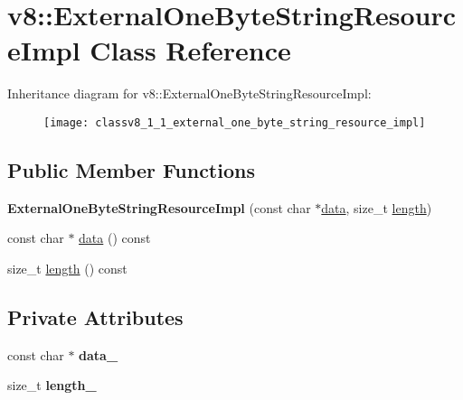 \hypertarget{classv8_1_1_external_one_byte_string_resource_impl}{}\section{v8\+:\+:External\+One\+Byte\+String\+Resource\+Impl Class Reference}
\label{classv8_1_1_external_one_byte_string_resource_impl}
Inheritance diagram for v8\+:\+:External\+One\+Byte\+String\+Resource\+Impl\+:\begin{figure}[H]
\begin{center}
\leavevmode
\texttt{[image: classv8\_1\_1\_external\_one\_byte\_string\_resource\_impl]}
\end{center}
\end{figure}
\subsection*{Public Member Functions}
\begin{DoxyCompactItemize}
\item 
{\bfseries External\+One\+Byte\+String\+Resource\+Impl} (const char $\ast$\hyperlink{classv8_1_1_external_one_byte_string_resource_impl_a37ada5dc21ecb982c50482c90fffe529}{data}, size\+\_\+t \hyperlink{classv8_1_1_external_one_byte_string_resource_impl_aedcf350d46f64cf1e3045658920d1dc8}{length})\hypertarget{classv8_1_1_external_one_byte_string_resource_impl_a46178fb208419f5ea99552871b3a373e}{}\label{classv8_1_1_external_one_byte_string_resource_impl_a46178fb208419f5ea99552871b3a373e}

\item 
const char $\ast$ \hyperlink{classv8_1_1_external_one_byte_string_resource_impl_a37ada5dc21ecb982c50482c90fffe529}{data} () const 
\item 
size\+\_\+t \hyperlink{classv8_1_1_external_one_byte_string_resource_impl_aedcf350d46f64cf1e3045658920d1dc8}{length} () const 
\end{DoxyCompactItemize}
\subsection*{Private Attributes}
\begin{DoxyCompactItemize}
\item 
const char $\ast$ {\bfseries data\+\_\+}\hypertarget{classv8_1_1_external_one_byte_string_resource_impl_a1ffd1e433e1d12bec9211bfa1804c01b}{}\label{classv8_1_1_external_one_byte_string_resource_impl_a1ffd1e433e1d12bec9211bfa1804c01b}

\item 
size\+\_\+t {\bfseries length\+\_\+}\hypertarget{classv8_1_1_external_one_byte_string_resource_impl_a915f91ba58fef447920672ad6d11711f}{}\label{classv8_1_1_external_one_byte_string_resource_impl_a915f91ba58fef447920672ad6d11711f}

\end{DoxyCompactItemize}
